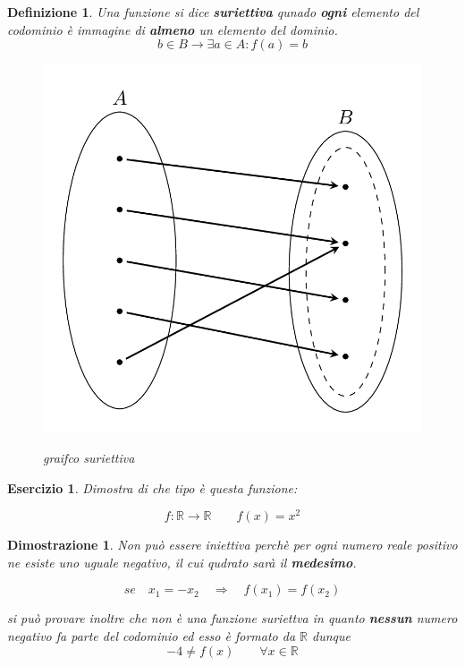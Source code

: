 \documentclass[12pt, a4paper]{article}
\theoremstyle{break}
\newtheorem{defn}{Definizione}
\theoremstyle{lemma}
\newtheorem{eser}{Esercizio}
\theoremstyle{lemma}
\newtheorem{dimo}{Dimostrazione}
\theoremstyle{lemma}
\begin{document}
\begin{defn} Una funzione si dice \textbf{suriettiva} qunado \textbf{ogni} elemento del codominio è immagine di \textbf{almeno} un elemento del dominio.
\begin{equation}
  b\in B \rightarrow \exists a \in A : f(a) = b
\end{equation}

\begin{figure}[ht]
	\center
	\includegraphics[scale=0.15]{suriettiva}
	\label{fig:grafico_suriettiva}
	\caption{graifco suriettiva}
\end{figure}
\end{defn}


\begin{eser}
Dimostra di che tipo è questa funzione:\vspace{1.5mm}

\begin{equation}
  f :\mathbb{R}\rightarrow \mathbb{R} \qquad f(x)=x^2
\end{equation}

\end{eser}

\begin{dimo}
Non può essere iniettiva perchè per ogni numero reale positivo ne esiste uno uguale negativo, il cui qudrato sarà il \textbf{medesimo}.\vspace{1.5mm}

\begin{equation}
  se\quad x_1 = -x_2 \quad \Rightarrow \quad f(x_1) = f(x_2)
\end{equation}  

\vspace{2mm}
si può provare inoltre che non è una funzione suriettva in quanto \textbf{nessun} numero negativo fa parte del codominio ed esso è formato da $\mathbb{R}$ dunque
\begin{equation}
  -4 \ne f(x) \qquad \forall x \in \mathbb{R}
\end{equation}
\end{dimo}
\end{document}
